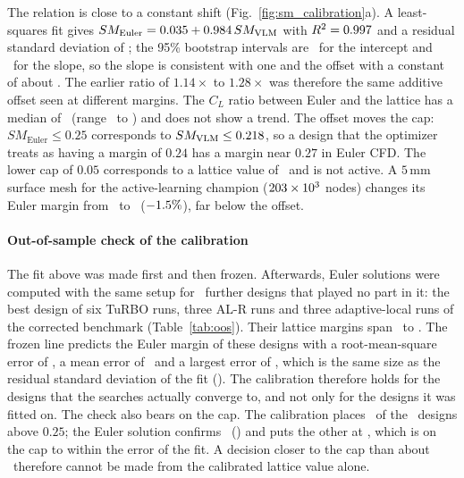 The relation is close to a constant shift (Fig.~\ref{fig:sm_calibration}a). A least-squares fit gives $SM_{\mathrm{Euler}} = 0.035 + 0.984\,SM_{\mathrm{VLM}}$ with $R^2 = 0.997$ and a residual standard deviation of \NcalSd; the 95\% bootstrap intervals are \NcalAci\ for the intercept and \NcalBci\ for the slope, so the slope is consistent with one and the offset with a constant of about \NcalA. The earlier ratio of $1.14\times$ to $1.28\times$ was therefore the same additive offset seen at different margins. The $C_L$ ratio between Euler and the lattice has a median of \NcalCLmed\ (range \NcalCLlo\ to \NcalCLhi) and does not show a trend. The offset moves the cap: $SM_{\mathrm{Euler}} \le 0.25$ corresponds to $SM_{\mathrm{VLM}} \le 0.218$, so a design that the optimizer treats as having a margin of $0.24$ has a margin near $0.27$ in Euler CFD. The lower cap of $0.05$ corresponds to a lattice value of \NcalFloorEquiv\ and is not active. A $5\,\mathrm{mm}$ surface mesh for the active-learning champion ($203\times 10^3$ nodes) changes its Euler margin from \NcalAlHsevenSM\ to \NcalAlHfiveSM\ ($-1.5\%$), far below the offset.

\paragraph{Out-of-sample check of the calibration} The fit above was made first and then frozen. Afterwards, Euler solutions were computed with the same setup for \NoosN\ further designs that played no part in it: the best design of six TuRBO runs, three AL-R runs and three adaptive-local runs of the corrected benchmark (Table~\ref{tab:oos}). Their lattice margins span \NoosVlmLo\ to \NoosVlmHi. The frozen line predicts the Euler margin of these designs with a root-mean-square error of \NoosRmse, a mean error of \NoosBias\ and a largest error of \NoosMax, which is the same size as the residual standard deviation of the fit (\NoosFitSd). The calibration therefore holds for the designs that the searches actually converge to, and not only for the designs it was fitted on. The check also bears on the cap. The calibration places \NoosPredOver\ of the \NoosN\ designs above $0.25$; the Euler solution confirms \NoosEulerOver\ (\NoosEulerHi) and puts the other at \NoosNearCap, which is on the cap to within the error of the fit. A decision closer to the cap than about \NoosMax\ therefore cannot be made from the calibrated lattice value alone.

\begin{table}[htbp]
\centering\small
\caption{Out-of-sample check of the static-margin calibration on \NoosN\ run champions that were not used in the fit. The prediction is $\NcalA + \NcalB\,SM_{\mathrm{VLM}}$ with the coefficients of Section~\ref{sec:sm_calibration} unchanged.}
\label{tab:oos}

\end{table}

